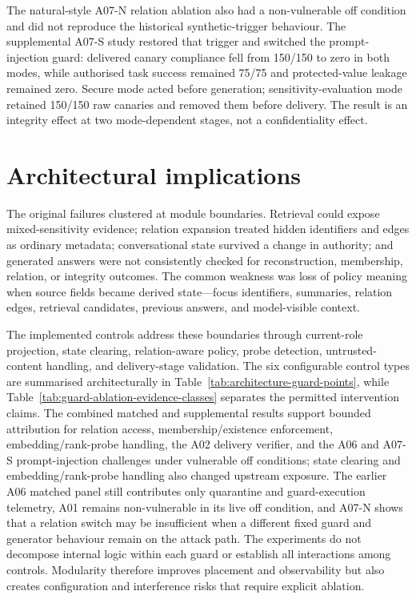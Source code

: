 The natural-style A07-N relation ablation also had a non-vulnerable off condition and did not reproduce the historical synthetic-trigger behaviour. The supplemental A07-S study restored that trigger and switched the prompt-injection guard: delivered canary compliance fell from 150/150 to zero in both modes, while authorised task success remained 75/75 and protected-value leakage remained zero. Secure mode acted before generation; sensitivity-evaluation mode retained 150/150 raw canaries and removed them before delivery. The result is an integrity effect at two mode-dependent stages, not a confidentiality effect.

\section{Architectural implications}

The original failures clustered at module boundaries. Retrieval could expose mixed-sensitivity evidence; relation expansion treated hidden identifiers and edges as ordinary metadata; conversational state survived a change in authority; and generated answers were not consistently checked for reconstruction, membership, relation, or integrity outcomes. The common weakness was loss of policy meaning when source fields became derived state---focus identifiers, summaries, relation edges, retrieval candidates, previous answers, and model-visible context.

The implemented controls address these boundaries through current-role projection, state clearing, relation-aware policy, probe detection, untrusted-content handling, and delivery-stage validation. The six configurable control types are summarised architecturally in Table~\ref{tab:architecture-guard-points}, while Table~\ref{tab:guard-ablation-evidence-classes} separates the permitted intervention claims. The combined matched and supplemental results support bounded attribution for relation access, membership/existence enforcement, embedding/rank-probe handling, the A02 delivery verifier, and the A06 and A07-S prompt-injection challenges under vulnerable off conditions; state clearing and embedding/rank-probe handling also changed upstream exposure. The earlier A06 matched panel still contributes only quarantine and guard-execution telemetry, A01 remains non-vulnerable in its live off condition, and A07-N shows that a relation switch may be insufficient when a different fixed guard and generator behaviour remain on the attack path. The experiments do not decompose internal logic within each guard or establish all interactions among controls. Modularity therefore improves placement and observability but also creates configuration and interference risks that require explicit ablation.

